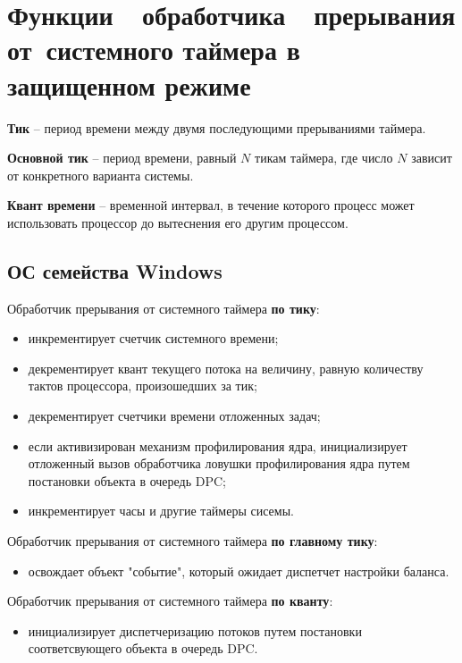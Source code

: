 \chapter{Функции~~обработчика~~прерывания от~системного
таймера в защищенном режиме}

\textbf{Тик} -- период времени между двумя последующими прерываниями таймера.

\textbf{Основной тик} -- период времени, равный $N$ тикам таймера, где число
$N$ зависит от конкретного варианта системы.

\textbf{Квант времени} -- временной интервал, в течение которого процесс
может использовать процессор до вытеснения его другим процессом.

\section{ОС семейства Windows}

Обработчик прерывания от системного таймера \textbf{по тику}:
\begin{itemize}[left=\parindent]
    \item инкрементирует счетчик системного времени;
    \item декрементирует квант текущего потока на величину, равную количеству
          тактов процессора, произошедших за тик;
    \item декрементирует счетчики времени отложенных задач;
    \item если активизирован механизм профилирования ядра, инициализирует
          отложенный вызов обработчика ловушки профилирования ядра путем
          постановки объекта в очередь DPC;
    \item инкрементирует часы и другие таймеры сисемы.
\end{itemize}

Обработчик прерывания от системного таймера \textbf{по главному тику}:
\begin{itemize}[left=\parindent]
    \item освождает объект "событие"{}, который ожидает диспетчет настройки
          баланса.
\end{itemize}

Обработчик прерывания от системного таймера \textbf{по кванту}:
\begin{itemize}[left=\parindent]
    \item инициализирует диспетчеризацию потоков путем постановки
          соответсвующего объекта в очередь DPC.
\end{itemize}

